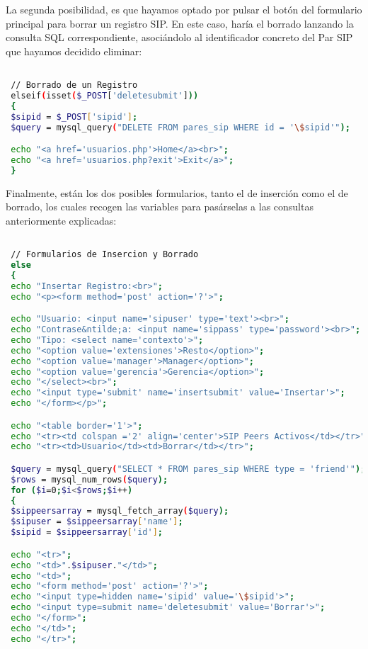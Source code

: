 {La segunda posibilidad, es que hayamos optado por pulsar el botón del formulario principal para borrar un registro SIP. En este caso, haría el borrado lanzando la consulta SQL correspondiente, asociándolo al identificador concreto del Par SIP que hayamos decidido eliminar:

\begin{lstlisting}[language=bash,title={./www/usuarios.php}]

 // Borrado de un Registro
 elseif(isset($_POST['deletesubmit']))
 {
 $sipid = $_POST['sipid'];
 $query = mysql_query("DELETE FROM pares_sip WHERE id = '\$sipid'");

 echo "<a href='usuarios.php'>Home</a><br>";
 echo "<a href='usuarios.php?exit'>Exit</a>";
 }

\end{lstlisting}

Finalmente, están los dos posibles formularios, tanto el de inserción como el de borrado, los cuales recogen las variables para pasárselas a las consultas anteriormente explicadas:

\begin{lstlisting}[language=bash,title={./www/usuarios.php}]

 // Formularios de Insercion y Borrado
 else
 {
 echo "Insertar Registro:<br>";
 echo "<p><form method='post' action='?'>";

 echo "Usuario: <input name='sipuser' type='text'><br>";
 echo "Contrase&ntilde;a: <input name='sippass' type='password'><br>";
 echo "Tipo: <select name='contexto'>";
 echo "<option value='extensiones'>Resto</option>";
 echo "<option value='manager'>Manager</option>";
 echo "<option value='gerencia'>Gerencia</option>";
 echo "</select><br>";
 echo "<input type='submit' name='insertsubmit' value='Insertar'>";
 echo "</form></p>";

 echo "<table border='1'>";
 echo "<tr><td colspan ='2' align='center'>SIP Peers Activos</td></tr>";
 echo "<tr><td>Usuario</td><td>Borrar</td></tr>";

 $query = mysql_query("SELECT * FROM pares_sip WHERE type = 'friend'");
 $rows = mysql_num_rows($query);
 for ($i=0;$i<$rows;$i++)
 {
 $sippeersarray = mysql_fetch_array($query);
 $sipuser = $sippeersarray['name'];
 $sipid = $sippeersarray['id'];

 echo "<tr>";
 echo "<td>".$sipuser."</td>";
 echo "<td>";
 echo "<form method='post' action='?'>";
 echo "<input type=hidden name='sipid' value='\$sipid'>";
 echo "<input type=submit name='deletesubmit' value='Borrar'>";
 echo "</form>";
 echo "</td>";
 echo "</tr>";


\end{lstlisting}}
